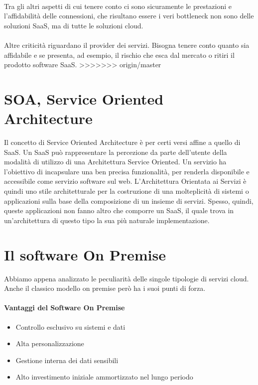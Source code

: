 \paragraph{}
Tra gli altri aspetti di cui tenere conto ci sono sicuramente le prestazioni e l'affidabilità delle connessioni, che risultano essere i veri bottleneck non sono delle soluzioni SaaS, ma di tutte le soluzioni cloud. 
\paragraph{}
Altre criticità riguardano il provider dei servizi. Bisogna tenere conto quanto sia affidabile e se presenta, ad esempio, il rischio che esca dal mercato o ritiri il prodotto software SaaS. 
>>>>>>> origin/master

\section{SOA, Service Oriented Architecture}
Il concetto di Service Oriented Architecture è per certi versi affine a quello di SaaS. Un SaaS può rappresentare la percezione da parte dell'utente della modalità di utilizzo di una Architettura Service Oriented. Un servizio ha l’obiettivo di incapsulare una ben precisa funzionalità, per renderla disponibile e accessibile come servizio software sul web. L'Architettura Orientata ai Servizi è quindi uno stile architetturale per la costruzione di una molteplicità di sistemi o applicazioni sulla base della composizione di un insieme di servizi. Spesso, quindi, queste applicazioni non fanno altro che comporre un SaaS, il quale trova in un'architettura di questo tipo la sua più naturale implementazione.
\section{Il software On Premise}
Abbiamo appena analizzato le peculiarità delle singole tipologie di servizi cloud. Anche il classico modello on premise però ha i suoi punti di forza.
\paragraph{Vantaggi del Software On Premise}
\begin{itemize}
	\item Controllo esclusivo su sistemi e dati
	\item Alta personalizzazione
	\item Gestione interna dei dati sensibili
	\item Alto investimento iniziale ammortizzato nel lungo periodo
\end{itemize}

